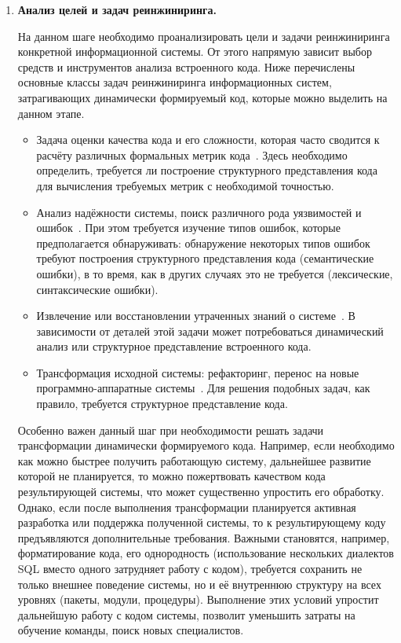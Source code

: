 \begin{enumerate}
  \item \textbf{Анализ целей и задач реинжиниринга.}
  
  На данном шаге необходимо проанализировать цели и задачи реинжиниринга конкретной информационной системы. От этого напрямую зависит выбор средств и инструментов анализа встроенного кода. Ниже перечислены основные классы задач реинжиниринга информационных систем, затрагивающих динамически формируемый код, которые можно выделить на данном этапе.
  
  \begin{itemize}
    \item Задача оценки качества кода и его сложности, которая часто сводится к расчёту различных формальных метрик кода~\cite{SoftwareMetrics, DSQLQualityMesureBIG}. Здесь необходимо определить, требуется ли построение структурного представления кода для вычисления требуемых метрик с необходимой точностью.
    \item Анализ надёжности системы, поиск различного рода уязвимостей и ошибок~\cite{qualityReeng, reengErrors}. При этом требуется изучение типов ошибок, которые предполагается обнаруживать: обнаружение некоторых типов ошибок требуют построения структурного представления кода (семантические ошибки), в то время, как в других случаях это не требуется (лексические, синтаксические ошибки).
    \item Извлечение или восстановлении утраченных знаний о системе~\cite{reengANT, qualityReeng}. В зависимости от деталей этой задачи может потребоваться динамический анализ или структурное представление встроенного кода.
    \item Трансформация исходной системы: рефакторинг, перенос на новые программно-аппаратные системы~\cite{SoftwareReeng2, SoftwareReeng4, reengANT, qualityReeng}. Для решения подобных задач, как правило, требуется структурное представление кода.
  \end{itemize}
  
Особенно важен данный шаг при необходимости решать задачи трансформации динамически формируемого кода. Например, если необходимо как можно быстрее получить работающую систему, дальнейшее развитие которой не планируется, то можно пожертвовать качеством кода результирующей системы, что может существенно упростить его обработку. Однако, если после выполнения трансформации планируется активная разработка или поддержка полученной системы, то к результирующему коду предъявляются дополнительные требования. Важными становятся, например, форматирование кода, его однородность (использование нескольких диалектов SQL вместо одного затрудняет работу с кодом), требуется сохранить не только внешнее поведение системы, но и её внутреннюю структуру на всех уровнях (пакеты, модули, процедуры). Выполнение этих условий упростит дальнейшую работу с кодом системы, позволит уменьшить затраты на обучение команды, поиск новых специалистов.
  

\end{enumerate}
